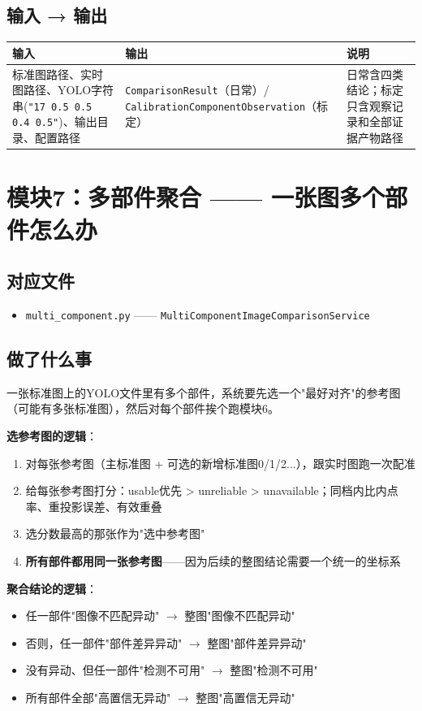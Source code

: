 \documentclass[12pt,a4paper]{ctexart}
\begin{document}
\subsection*{输入 → 输出}
\noindent\begin{tabular}{|p{4cm}|p{4cm}|p{5cm}|}
\hline
\textbf{输入} & \textbf{输出} & \textbf{说明} \\
\hline
标准图路径、实时图路径、YOLO字符串(\texttt{"17 0.5 0.5 0.4 0.5"})、输出目录、配置路径 & \texttt{ComparisonResult}（日常）/ \texttt{CalibrationComponentObservation}（标定） & 日常含四类结论；标定只含观察记录和全部证据产物路径 \\
\hline
\end{tabular}


\section{模块7：多部件聚合 —— 一张图多个部件怎么办}

\subsection*{对应文件}
\begin{itemize}
\item \texttt{multi\_component.py} —— \texttt{MultiComponentImageComparisonService}
\end{itemize}

\subsection*{做了什么事}

一张标准图上的YOLO文件里有多个部件，系统要先选一个"最好对齐"的参考图（可能有多张标准图），然后对每个部件挨个跑模块6。

\textbf{选参考图的逻辑}：
\begin{enumerate}
\item 对每张参考图（主标准图 + 可选的新增标准图0/1/2...），跟实时图跑一次配准
\item 给每张参考图打分：usable优先 > unreliable > unavailable；同档内比内点率、重投影误差、有效重叠
\item 选分数最高的那张作为"选中参考图"
\item \textbf{所有部件都用同一张参考图}——因为后续的整图结论需要一个统一的坐标系
\end{enumerate}

\textbf{聚合结论的逻辑}：
\begin{itemize}
\item 任一部件"图像不匹配异动" $\to$ 整图"图像不匹配异动"
\item 否则，任一部件"部件差异异动" $\to$ 整图"部件差异异动"
\item 没有异动、但任一部件"检测不可用" $\to$ 整图"检测不可用"
\item 所有部件全部"高置信无异动" $\to$ 整图"高置信无异动"
\end{itemize}
\end{document}

